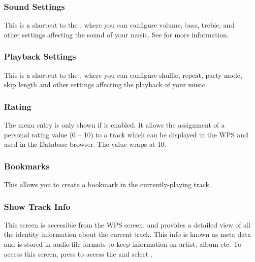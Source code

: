 \subsubsection{Sound Settings}
This is a shortcut to the , where you can configure volume,
bass, treble, and other settings affecting the sound of your music.  
See  for more information.

\subsubsection{Playback Settings}
This is a shortcut to the , where you can configure shuffle,
repeat, party mode, skip length and other settings affecting the playback of your music.  

\subsubsection{Rating}
The menu entry is only shown if  is
enabled. It allows the assignment of a personal rating value (0 -- 10)
to a track which can be displayed in the WPS and used in the Database
browser. The value wraps at 10.

\subsubsection{Bookmarks}
This allows you to create a bookmark in the currently-playing track.

\subsubsection{\label{ref:trackinfoviewer}Show Track Info}
This screen is accessible from the WPS screen, and provides a detailed view of
all the identity information about the current track. This info is known as
meta data and is stored in audio file formats to keep information on artist,
album etc. To access this screen, %
%
%
      {press \ActionWpsContext{} to access the 
       and select . }
%

